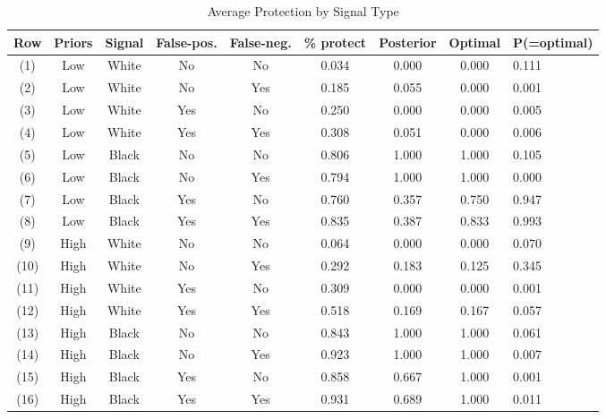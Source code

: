 \begin{table}[H]\centering \footnotesize \caption{Average Protection by Signal Type} \begin{tabular}{cccccccc} \hline \hline
\textbf{Row}&\textbf{Priors}&\textbf{Signal}&\textbf{False-pos.}&\textbf{False-neg.}&\textbf{\% protect}& \textbf{Posterior} & \textbf{Optimal} & \textbf{P(=optimal)} \\ \hline
(1)&Low&White&No&No&0.034&0.000&0.000&0.111\\
(2)&Low&White&No&Yes&0.185&0.055&0.000&0.001\\
(3)&Low&White&Yes&No&0.250&0.000&0.000&0.005\\
(4)&Low&White&Yes&Yes&0.308&0.051&0.000&0.006\\
(5)&Low&Black&No&No&0.806&1.000&1.000&0.105\\
(6)&Low&Black&No&Yes&0.794&1.000&1.000&0.000\\
(7)&Low&Black&Yes&No&0.760&0.357&0.750&0.947\\
(8)&Low&Black&Yes&Yes&0.835&0.387&0.833&0.993\\
(9)&High&White&No&No&0.064&0.000&0.000&0.070\\
(10)&High&White&No&Yes&0.292&0.183&0.125&0.345\\
(11)&High&White&Yes&No&0.309&0.000&0.000&0.001\\
(12)&High&White&Yes&Yes&0.518&0.169&0.167&0.057\\
(13)&High&Black&No&No&0.843&1.000&1.000&0.061\\
(14)&High&Black&No&Yes&0.923&1.000&1.000&0.007\\
(15)&High&Black&Yes&No&0.858&0.667&1.000&0.001\\
(16)&High&Black&Yes&Yes&0.931&0.689&1.000&0.011\\
\hline \end{tabular} \end{table}
